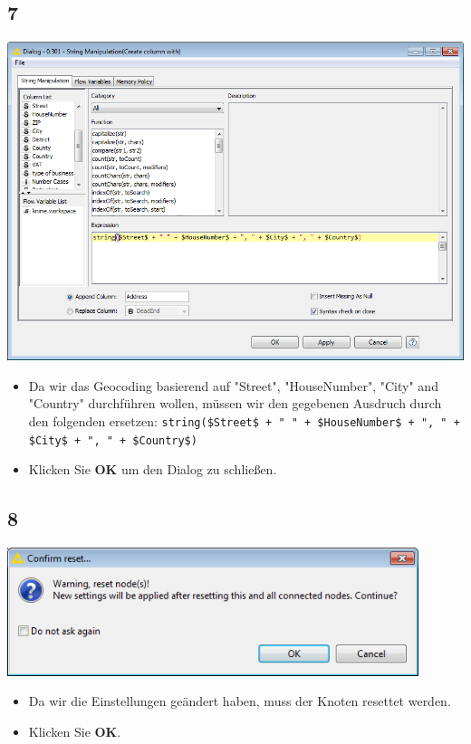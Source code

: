 \documentclass{beamer}
\begin{document}
\subsection{7}
\begin{frame}
	\begin{center}
  		\includegraphics[height=0.5\textheight]{7.png}
	\end{center}
	\begin{itemize}
		\item Da wir das Geocoding basierend auf "Street", "HouseNumber", "City" and "Country" durchführen wollen, müssen wir den gegebenen Ausdruch durch den folgenden ersetzen: \texttt{string(\$Street\$ + " " + \$HouseNumber\$ + ", " + \$City\$ + ", " + \$Country\$)}
		\item Klicken Sie \textbf{OK} um den Dialog zu schließen.
	\end{itemize}
\end{frame}

\subsection{8}
\begin{frame}
	\begin{center}
  		\includegraphics[width=0.9\textwidth]{8.png}
	\end{center}
	\begin{itemize}
		\item Da wir die Einstellungen geändert haben, muss der Knoten resettet werden. 
		\item Klicken Sie \textbf{OK}.
	\end{itemize}
\end{frame}
\end{document}
